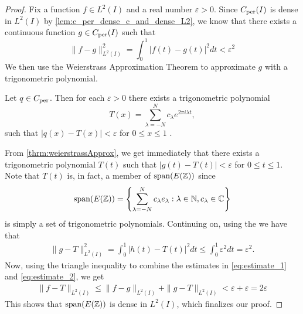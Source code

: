 \documentclass[../thesis.tex]{subfiles}
\begin{document}
\begin{proof}
    Fix a function $f\in L^2(I)$ and a real number $\varepsilon >0$. Since $C_{\text{per}}(I)$ is dense in $L^2(I)$ by \cref{lem:c_per_dense_c_and_dense_L2}, we know that there exists a continuous function $g \in C_{\text{per}}(I)$ such that
    \begin{equation}\label{eq:estimate_1}
        \| f-g \|_{L^2(I)}^2 = \int_0^1 \left|f(t)-g(t) \right|^2dt < \varepsilon^2
    \end{equation}
    We then use the Weierstrass Approximation Theorem to approximate $g$ with a trigonometric polynomial. 
    \begin{theorem}\label{thrm:weierstrassApprox}
        Let $q\in C_{\text{per}}$. Then for each $\varepsilon>0$ there exists a trigonometric polynomial %
        \begin{equation}
            T(x) = \sum_{\lambda=-N}^N c_\lambda e^{2\pi i \lambda t},
        \end{equation}
        such that $|q(x)-T(x)|<\varepsilon$ for $0 \leq x \leq 1$ \cite{durenInvitationClassicalAnalysis2012}.
    \end{theorem}
    From \cref{thrm:weierstrassApprox}, we get immediately that there exists a trigonometric polynomial $T(t)$ such that $|g(t)-T(t)|<\varepsilon$ for $0 \leq t \leq 1$. Note that $T(t)$ is, in fact, a member of $\operatorname{span}(E(\mathbb{Z}))$ since %
    \begin{equation*}  %
        \spn{E(\Z)}=\left\{\sum_{\lambda=-N}^N c_\lambda e_\lambda : \lambda \in \N, c_\lambda \in \C\right\}
    \end{equation*}
    is simply a set of trigonometric polynomials. Continuing on, using the \Ltwonorm we have that
    \begin{align}\label{eq:estimate_2}
        \| g-T \|_{L^2(I)}^2 = \int_0^1 \left|h(t)-T(t) \right|^2dt \leq \int_0^1 \varepsilon^2 dt = \varepsilon^2.
    \end{align}
    Now, using the triangle inequality to combine the estimates in \cref{eq:estimate_1} and \cref{eq:estimate_2}, we get
    \begin{align*} 
        \| f-T\|_{L^2(I)} \leq  \| f-g\|_{L^2(I)} +\| g-T\|_{L^2(I)} < \varepsilon + \varepsilon =  2 \varepsilon
    \end{align*}
    This shows that $\operatorname{span}(E(\mathbb{Z}))$ is dense in $L^2(I)$, which finalizes our proof.
\end{proof}
\end{document}
